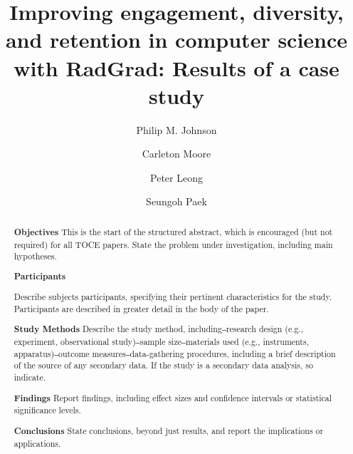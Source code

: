 \documentclass[acmsmall]{acmart}
\begin{document}
\title[RadGrad: Results of a case study]{Improving engagement, diversity, and retention in computer science with RadGrad: Results of a case study}

\author{Philip M. Johnson}
\author{Carleton Moore}

\author{Peter Leong}
\author{Seungoh Paek}

\renewcommand{\shortauthors}{You et al.}

\newcommand{\AbstractCategory}[1]{%
  \par\addvspace{.5\baselineskip}%
  \noindent\textbf{#1}\quad\ignorespaces
}

%
\begin{abstract}
\AbstractCategory{Objectives}This is the start of the structured abstract, which is encouraged (but not required) for all TOCE papers. State the problem under investigation, including main hypotheses.


\AbstractCategory{Participants}
Describe subjects participants, specifying their pertinent characteristics for the study. Participants are described in greater detail in the body of the paper.

\AbstractCategory{Study Methods} Describe the study method, including‒research design (e.g., experiment, observational study)‒sample size‒materials used (e.g., instruments, apparatus)‒outcome measures‒data-gathering procedures, including a brief description of the source of any secondary data. If the study is a secondary data analysis, so indicate.

\AbstractCategory{Findings} Report findings, including effect sizes and confidence intervals or statistical significance levels.

\AbstractCategory{Conclusions} State conclusions, beyond just results, and report the implications or applications.

\end{abstract}
\end{document}
